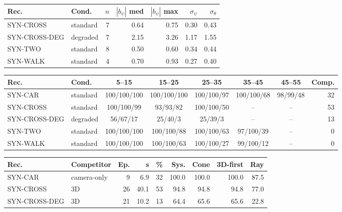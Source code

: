 \begin{tabular}{llrrrrr}
\toprule
Rec. & Cond. & $n$ & $|b_\psi|$ med & $|b_\psi|$ max & $\sigma_\psi$ & $\sigma_\theta$ \\
\midrule
SYN-CROSS & standard & 7 & 0.64 & 0.75 & 0.30 & 0.43 \\
SYN-CROSS-DEG & degraded & 7 & 2.15 & 3.26 & 1.17 & 1.55 \\
SYN-TWO & standard & 8 & 0.50 & 0.60 & 0.34 & 0.44 \\
SYN-WALK & standard & 4 & 0.70 & 0.93 & 0.27 & 0.40 \\
\bottomrule
\end{tabular}

\begin{tabular}{llcccccr}
\toprule
Rec. & Cond. & 5--15 & 15--25 & 25--35 & 35--45 & 45--55 & Comp. \\
\midrule
SYN-CAR & standard & 100/100/100 & 100/100/100 & 100/100/97 & 100/100/68 & 98/99/48 & 32 \\
SYN-CROSS & standard & 100/100/99 & 93/93/82 & 100/100/50 & -- & -- & 53 \\
SYN-CROSS-DEG & degraded & 56/67/17 & 25/40/3 & 25/39/3 & -- & -- & 13 \\
SYN-TWO & standard & 100/100/100 & 100/100/88 & 100/100/63 & 97/100/39 & -- & 0 \\
SYN-WALK & standard & 100/100/100 & 100/100/63 & 100/100/27 & 99/100/12 & -- & 0 \\
\bottomrule
\end{tabular}

\begin{tabular}{llrrrrrrr}
\toprule
Rec. & Competitor & Ep. & s & \% & Sys. & Cone & 3D-first & Ray \\
\midrule
SYN-CAR & camera-only & 9 & 6.9 & 32 & 100.0 & 100.0 & 100.0 & 87.5 \\
SYN-CROSS & 3D & 26 & 40.1 & 53 & 94.8 & 94.8 & 94.8 & 77.0 \\
SYN-CROSS-DEG & 3D & 21 & 10.2 & 13 & 64.4 & 65.6 & 65.6 & 22.8 \\
\bottomrule
\end{tabular}

